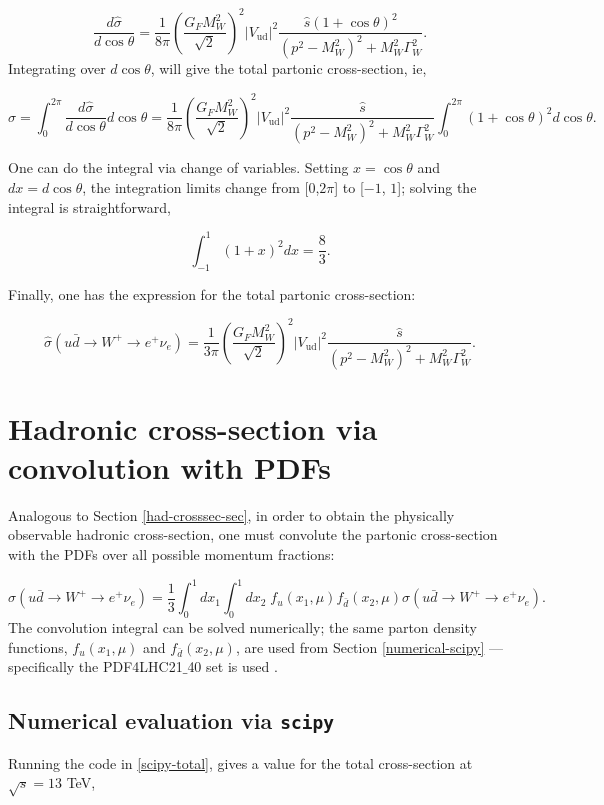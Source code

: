 \documentclass[a4paper,11pt]{article}
\begin{document}
$$
\frac{d\hat{\sigma}}{d\cos\theta} = \frac{1}{8\pi}\left(\frac{G_FM_W^2}{\sqrt{2}}\right)^2|V_\text{ud}|^2 \frac{\hat{s}(1+ \cos\theta)^2}{(p^2-M_W^2)^2 +M_W^2\Gamma_W^2}.
$$
Integrating over $d\cos\theta$, will give the total partonic cross-section, ie, 

$$
\hat{\sigma} = \int_0^{2\pi} \frac{d\hat{\sigma}}{d\cos\theta} d\cos\theta =\frac{1}{8\pi}\left(\frac{G_FM_W^2}{\sqrt{2}}\right)^2|V_\text{ud}|^2 \frac{\hat{s}}{(p^2-M_W^2)^2 +M_W^2\Gamma_W^2} \int_0^{2\pi}  (1+ \cos\theta)^2 d\cos\theta.
$$


One can do the integral via change of variables. Setting $x = \cos\theta$ and $dx = d\cos\theta$, the integration limits change from [$0$,$2\pi$] to [$-1$, $1$]; solving the integral is straightforward,


$$\int_{-1}^1 (1+x)^2 dx = \frac{8}{3}.$$

Finally, one has the expression for the total partonic cross-section:

\begin{equation}\label{total-partonic-full-amp}
	\hat{\sigma}(u\bar{d} \rightarrow W^+ \rightarrow e^+ \nu_e) =\frac{1}{3\pi}\left(\frac{G_FM_W^2}{\sqrt{2}}\right)^2|V_\text{ud}|^2 \frac{\hat{s}}{(p^2-M_W^2)^2 +M_W^2\Gamma_W^2}.
\end{equation}

\section{Hadronic cross-section via convolution with PDFs}\label{sec7}
Analogous to Section \ref{had-crosssec-sec}, in order to obtain the physically observable hadronic cross-section, one must convolute the partonic cross-section with the PDFs over all possible momentum fractions:


\begin{equation}\label{convolution_2}
		\sigma(u\bar{d} \rightarrow W^+ \rightarrow e^+ \nu_e)= \frac{1}{3}\int_0^1 dx_1 \int_0^1 dx_2\; f_u(x_1, \mu)f_{\bar{d}}(x_2,\mu) 	\hat{\sigma}(u\bar{d} \rightarrow W^+ \rightarrow e^+ \nu_e).
\end{equation}
The convolution integral can be solved numerically; the same parton density functions, $ f_u(x_1, \mu)$ and $f_{\bar{d}}(x_2,\mu)$, are used from Section \ref{numerical-scipy} --- specifically the PDF4LHC21$\_$40 set is used \cite{PDF4LHCWorkingGroup:2022cjn}. 

\subsection{Numerical evaluation via \texttt{scipy}}
Running the code in \ref{scipy-total}, gives a value for the total cross-section at $\sqrt{s} = 13$ TeV,
\end{document}
